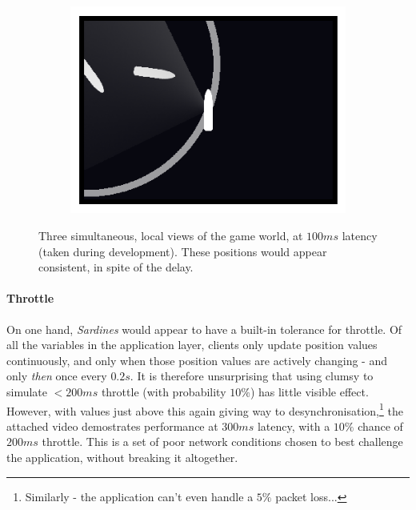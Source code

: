 \documentclass[a4paper, 9pt]{article}
\begin{document}
\begin{flushleft}
\begin{figure}[h]
\begin{subfigure}[b]{0.3\textwidth}
\includegraphics[width=\textwidth]{100ms Latency (1)}
\end{subfigure}
\caption{Three simultaneous, local views of the game world, at $100ms$ latency (taken during development). These positions would appear consistent, in spite of the delay.}
\label{Lag Testing}
\end{figure}

\paragraph{Throttle} On one hand, \textit{Sardines} would appear to have a built-in tolerance for throttle. Of all the variables in the application layer, clients only update position values continuously, and only when those position values are actively changing - and only \textit{then} once every $0.2s$. It is therefore unsurprising that using clumsy to simulate $<200ms$ throttle (with probability $10\%$) has little visible effect. However, with values just above this again giving way to desynchronisation,\footnote{Similarly - the application can't even handle a $5\%$ packet loss...} the attached video demostrates performance at $300ms$ latency, with a $10\%$ chance of $200ms$ throttle. This is a set of poor network conditions chosen to best challenge the application, without breaking it altogether.%




\end{flushleft}
\end{document}
